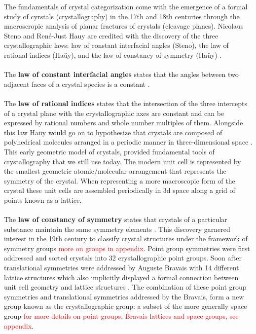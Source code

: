The fundamentals of crystal categorization come with the emergence of a formal study of cyrstals (crystallography) in the 17th and 18th centuries through the macroscropic analysis of planar fractures of crystals (cleavage planes). Nicolaus Steno and René-Just Hauy are credited with the discovery of the three crystallographic laws: law of constant interfacial angles (Steno), the law of rational indices (Haüy), and the law of constancy of symmetry (Haüy) \cite{aroyo}.
\\
\\
 The \textbf{law of constant interfacial angles} states that the angles between two adjacent faces of a crystal species is a constant \cite{steno}.
\\
\\
The \textbf{law of rational indices} states that the intersection of the three intercepts of a crystal plane with the crystallographic axes are constant and can be expressed by rational numbers and whole number multiples of them. Alongside this law Haüy would go on to hypothesize that crystals are composed of polyhedrical molecules arranged in a periodic manner in three-dimensional space \cite{hauy}. This early geometric model of crystals, provided fundamental tools of crystallography that we still use today. The modern unit cell is represented by the smallest geometric atomic/molecular arrangement that represents the symmetry of the crystal. When representing a more macroscopic form of the crystal these unit cells are assembled periodically in 3d space along a grid of points known as a lattice\cite{sands}.
\\
\\
The \textbf{law of constancy of symmetry} states that crystals of a particular substance maintain the same symmetry elements \cite{hauy}. This discovery garnered interest in the 19th century to classify crystal structures under the framework of symmetry groups \textcolor{red}{more on groups in appendix}. Point group symmetries were first addressed and sorted crystals into 32 crystallographic point groups. Soon after translational symmetries were addressed by Auguste Bravais with 14 different lattice structures which also implicitly displayed a formal connection between unit cell geometry and lattice structures \cite{aroyo}. The combination of these point group symmetries and translational symmetries addressed by the Bravais, form a new group known as the crystallographic group: a subset of the more generally space group \textcolor{red}{for more details on point groups, Bravais lattices and space groups, see appendix}.
\\
\\

